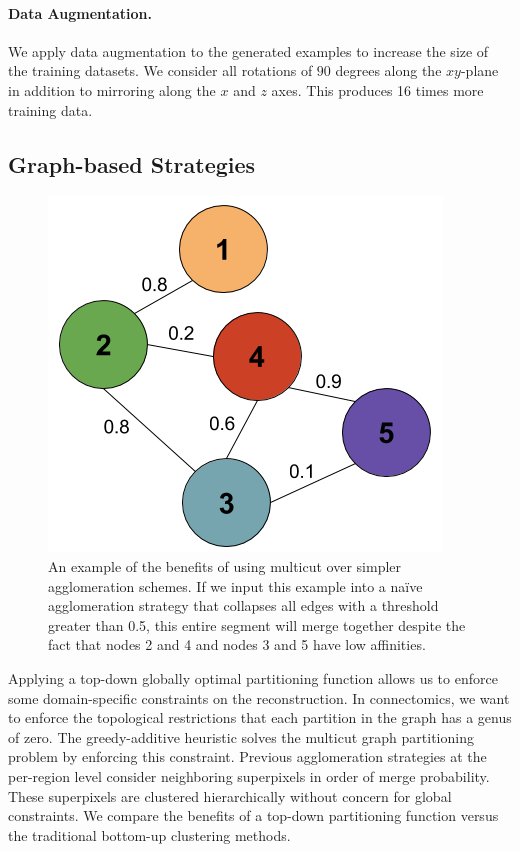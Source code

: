 \paragraph{Data Augmentation.}
We apply data augmentation to the generated examples to increase the size of the training datasets. 
We consider all rotations of $90$ degrees along the $xy$-plane in addition to mirroring along the $x$ and $z$ axes. 
This produces 16 times more training data. 

\subsection{Graph-based Strategies}

\begin{figure}
	\centering
	\includegraphics[width=0.8\linewidth]{./figures/multicut.png}
	\caption{An example of the benefits of using multicut over simpler agglomeration schemes. If we input this example into a na\"ive agglomeration strategy that collapses all edges with a threshold greater than 0.5, this entire segment will merge together despite the fact that nodes 2 and 4 and nodes 3 and 5 have low affinities.}
	\label{fig:multicut}
\end{figure}

Applying a top-down globally optimal partitioning function allows us to enforce some domain-specific constraints on the reconstruction.
In connectomics, we want to enforce the topological restrictions that each partition in the graph has a genus of zero. 
The greedy-additive heuristic solves the multicut graph partitioning problem by enforcing this constraint.
Previous agglomeration strategies at the per-region level consider neighboring superpixels in order of merge probability. 
These superpixels are clustered hierarchically without concern for global constraints.
We compare the benefits of a top-down partitioning function versus the traditional bottom-up clustering methods.

